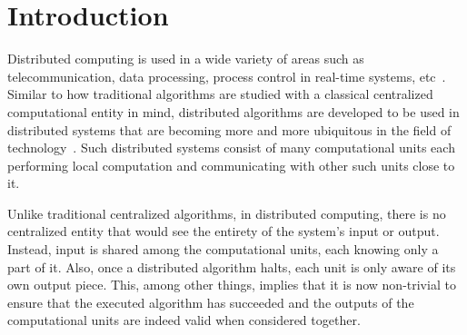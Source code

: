 \chapter{Introduction}
\label{chapter:intro}

Distributed computing is used in a wide variety of areas
such as telecommunication, data processing, process control in real-time systems, etc~\cite{Lynch1996}. Similar to
how traditional algorithms are studied with a classical
centralized computational entity in mind, distributed
algorithms are developed to be used in distributed
systems that are becoming more and more ubiquitous in the
field of technology~\cite{Attiya2004}. Such distributed
systems consist of many computational units each
performing local computation and communicating
with other such units close to it.

Unlike traditional
centralized algorithms, in distributed computing,
there is no centralized entity that would see the
entirety of the system's input or output. Instead,
input is shared among the computational units, each
knowing only a part of it. Also, once a distributed
algorithm halts, each unit is only aware of its
own output piece. This, among other things, implies
that it is now non-trivial to ensure that the
executed algorithm has succeeded and the
outputs of the computational units are
indeed valid when considered together.

